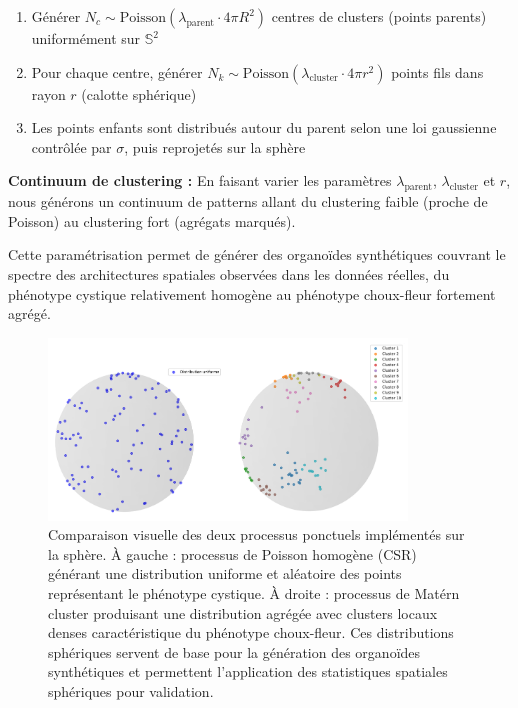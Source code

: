 \begin{enumerate}
    \item Générer $N_c \sim \text{Poisson}(\lambda_{\text{parent}} \cdot 4\pi R^2)$ centres de clusters (points parents) uniformément sur $\mathbb{S}^2$
    \item Pour chaque centre, générer $N_k \sim \text{Poisson}(\lambda_{\text{cluster}} \cdot 4\pi r^2)$ points fils dans rayon $r$ (calotte sphérique)
    \item Les points enfants sont distribués autour du parent selon une loi gaussienne contrôlée par $\sigma$, puis reprojetés sur la sphère
\end{enumerate}

\textbf{Continuum de clustering :}
En faisant varier les paramètres $\lambda_{\text{parent}}$, $\lambda_{\text{cluster}}$ et $r$, nous générons un continuum de patterns allant du clustering faible (proche de Poisson) au clustering fort (agrégats marqués).

Cette paramétrisation permet de générer des organoïdes synthétiques couvrant le spectre des architectures spatiales observées dans les données réelles, du phénotype cystique relativement homogène au phénotype choux-fleur fortement agrégé.

\begin{figure}[htbp]
    \centering
    \includegraphics[width=0.85\textwidth]{../img/distrib2.png}
    \caption{Comparaison visuelle des deux processus ponctuels implémentés sur la sphère. À gauche : processus de Poisson homogène (CSR) générant une distribution uniforme et aléatoire des points représentant le phénotype cystique. À droite : processus de Matérn cluster produisant une distribution agrégée avec clusters locaux denses caractéristique du phénotype choux-fleur. Ces distributions sphériques servent de base pour la génération des organoïdes synthétiques et permettent l'application des statistiques spatiales sphériques pour validation.}
    \label{fig:distrib2}
\end{figure}

